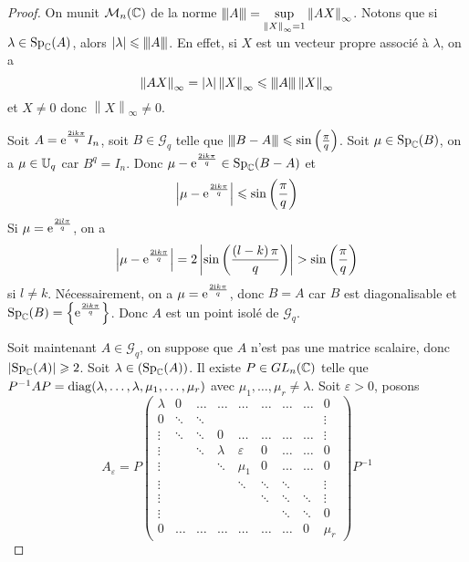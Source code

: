 \documentclass[12pt]{article}
\begin{document}
\begin{proof}
	On munit $\mathcal{M}_{n}(\mathbb{C})$ de la norme ${\left\vert\kern-0.25ex\left\vert\kern-0.25ex\left\vert{}A \right\vert\kern-0.25ex\right\vert\kern-0.25ex\right\vert}=\sup\limits_{\left\lVert X\right\rVert_{\infty}=1}\left\lVert AX\right\rVert_{\infty}$. Notons que si $\lambda\in\operatorname{Sp}_{\mathbb{C}}(A)$, alors $\left\lvert\lambda\right\rvert\leqslant{\left\vert\kern-0.25ex\left\vert\kern-0.25ex\left\vert{}A \right\vert\kern-0.25ex\right\vert\kern-0.25ex\right\vert}$. En effet, si $X$ est un vecteur propre associé à $\lambda$, on a 
	\begin{equation}
		\left\lVert AX\right\rVert_{\infty}=\left\lvert\lambda\right\rvert\left\lVert X\right\rVert_{\infty}\leqslant{\left\vert\kern-0.25ex\left\vert\kern-0.25ex\left\vert{}A \right\vert\kern-0.25ex\right\vert\kern-0.25ex\right\vert}\left\lVert X\right\rVert_{\infty}
	\end{equation}
	et $X\neq0$ donc $\left\lVert X\right\rVert_{\infty}\neq0$.

	Soit $A=\mathrm{e}^{\frac{2\mathrm{i} k\pi}{q}}I_{n}$, soit $B\in \mathcal{G}_{q}$ telle que ${\left\vert\kern-0.25ex\left\vert\kern-0.25ex\left\vert{}B-A \right\vert\kern-0.25ex\right\vert\kern-0.25ex\right\vert}\leqslant\sin\left(\frac{\pi}{q}\right)$. Soit $\mu\in\operatorname{Sp}_{\mathbb{C}}(B)$, on a $\mu\in\mathbb{U}_{q}$ car $B^{q}=I_{n}$. Donc $\mu-\mathrm{e}^{\frac{2\mathrm{i} k\pi}{q}}\in\operatorname{Sp}_{\mathbb{C}}(B-A)$ et 
	\begin{equation}
		\left\lvert\mu-\mathrm{e}^{\frac{2\mathrm{i} k\pi}{q}}\right\rvert\leqslant\sin\left(\frac{\pi}{q}\right)
	\end{equation}
	Si $\mu=\mathrm{e}^{\frac{2\mathrm{i} l\pi}{q}}$, on a 
	\begin{equation}
		\left\lvert\mu-\mathrm{e}^{\frac{2\mathrm{i} k\pi}{q}}\right\rvert=2\left\lvert\sin\left(\frac{\left(l-k\right)\pi}{q}\right)\right\rvert>\sin\left(\frac{\pi}{q}\right)
	\end{equation}
	si $l\neq k$. Nécessairement, on a $\mu=\mathrm{e}^{\frac{2\mathrm{i} k\pi}{q}}$, donc $B=A$ car $B$ est diagonalisable et $\operatorname{Sp}_{\mathbb{C}}(B)=\left\lbrace\mathrm{e}^{\frac{2\mathrm{i} k\pi}{q}}\right\rbrace$. Donc $A$ est un point isolé de $\mathcal{G}_{q}$.

	Soit maintenant $A\in\mathcal{G}_{q}$, on suppose que $A$ n'est pas une matrice scalaire, donc $\left\lvert\operatorname{Sp}_{\mathbb{C}}(A)\right\rvert\geqslant2$. Soit $\lambda\in\left(\operatorname{Sp}_{\mathbb{C}}(A)\right)$.
	Il existe $P\in GL_{n}(\mathbb{C})$ telle que $P^{-1}AP=\operatorname{diag}(\lambda,\dots,\lambda,\mu_{1},\dots,\mu_{r})$ avec $\mu_{1},\dots,\mu_{r}\neq\lambda$. Soit $\varepsilon>0$, posons 
	\begin{equation}
		A_{\varepsilon}=P
		\begin{pmatrix}
			\lambda &0 &\dots&\dots &\dots&\dots&\dots&\dots&0\\
			0 & \ddots & \ddots &&&&&&\vdots\\
			\vdots &\ddots&\ddots&0&\dots&\dots&\dots&\dots&\vdots\\
			\vdots&&\ddots&\lambda & \varepsilon&0&\dots&\dots&0\\
			\vdots&&& \ddots & \mu_{1}&0&\dots&\dots&0\\
			\vdots&&&&\ddots&\ddots&\ddots&&\vdots\\
			\vdots&&&&&\ddots&\ddots&\ddots&\vdots\\
			\vdots&&&&&&\ddots&\ddots&0\\
			0&\dots&\dots&\dots&\dots&\dots&\dots&0&\mu_{r}
		\end{pmatrix}P^{-1}
	\end{equation}


\end{proof}
\end{document}
